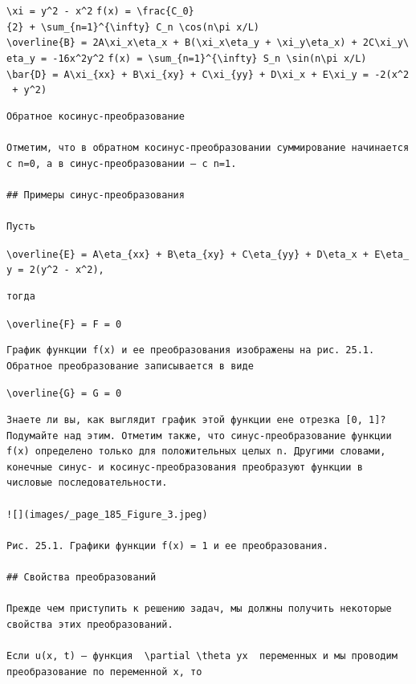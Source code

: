 \documentclass[
  ukrainian,
]{article}
\begin{document}
\texttt{\textbackslash{}xi\ =\ y\^{}2\ -\ x\^{}2}
\texttt{f(x)\ =\ \textbackslash{}frac\{C\_0\}\{2\}\ +\ \textbackslash{}sum\_\{n=1\}\^{}\{\textbackslash{}infty\}\ C\_n\ \textbackslash{}cos(n\textbackslash{}pi\ x/L)}
\texttt{\textbackslash{}overline\{B\}\ =\ 2A\textbackslash{}xi\_x\textbackslash{}eta\_x\ +\ B(\textbackslash{}xi\_x\textbackslash{}eta\_y\ +\ \textbackslash{}xi\_y\textbackslash{}eta\_x)\ +\ 2C\textbackslash{}xi\_y\textbackslash{}eta\_y\ =\ -16x\^{}2y\^{}2}
\texttt{f(x)\ =\ \textbackslash{}sum\_\{n=1\}\^{}\{\textbackslash{}infty\}\ S\_n\ \textbackslash{}sin(n\textbackslash{}pi\ x/L)}
\texttt{\textbackslash{}bar\{D\}\ =\ A\textbackslash{}xi\_\{xx\}\ +\ B\textbackslash{}xi\_\{xy\}\ +\ C\textbackslash{}xi\_\{yy\}\ +\ D\textbackslash{}xi\_x\ +\ E\textbackslash{}xi\_y\ =\ -2(x\^{}2\ +\ y\^{}2)}

\begin{verbatim}
Обратное косинус-преобразование

Отметим, что в обратном косинус-преобразовании суммирование начинается с n=0, а в синус-преобразовании — с n=1.

## Примеры синус-преобразования

Пусть
\end{verbatim}

\texttt{\textbackslash{}overline\{E\}\ =\ A\textbackslash{}eta\_\{xx\}\ +\ B\textbackslash{}eta\_\{xy\}\ +\ C\textbackslash{}eta\_\{yy\}\ +\ D\textbackslash{}eta\_x\ +\ E\textbackslash{}eta\_y\ =\ 2(y\^{}2\ -\ x\^{}2),}

\begin{verbatim}
тогда
\end{verbatim}

\texttt{\textbackslash{}overline\{F\}\ =\ F\ =\ 0}

\begin{verbatim}
График функции f(x) и ее преобразования изображены на рис. 25.1. Обратное преобразование записывается в виде
\end{verbatim}

\texttt{\textbackslash{}overline\{G\}\ =\ G\ =\ 0}

\begin{verbatim}
Знаете ли вы, как выглядит график этой функции ене отрезка [0, 1]? Подумайте над этим. Отметим также, что синус-преобразование функции f(x) определено только для положительных целых n. Другими словами, конечные синус- и косинус-преобразования преобразуют функции в числовые последовательности.

![](images/_page_185_Figure_3.jpeg)

Рис. 25.1. Графики функции f(x) = 1 и ее преобразования.

## Свойства преобразований

Прежде чем приступить к решению задач, мы должны получить некоторые свойства этих преобразований.

Если u(x, t) — функция  \partial \theta yx  переменных и мы проводим преобразование по переменной x, то
\end{verbatim}
\end{document}
